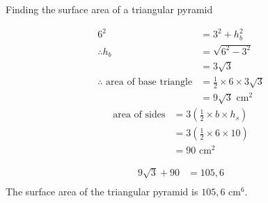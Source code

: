 \begin{wex}{Finding the surface area of a triangular pyramid}
{\begin{align*}
6^2 &= 3^2+h_b^2\\
\therefore h_b&=\sqrt{6^2-3^2}\\
&=3\sqrt{3}\\
\therefore \mbox{ area of base triangle} &= \frac{1}{2} \times 6 \times 3\sqrt{3}\\
&=9\sqrt{3}\mbox{ cm}^2
\end{align*}
\begin{align*}
 \mbox{area of sides} &= 3(\frac{1}{2} \times b\times h_s)\\
&=3(\frac{1}{2} \times 6 \times 10)\\
&=90\mbox{ cm}^2
\end{align*}

\begin{align*}
9\sqrt{3} + 90&=105,6\\

\end{align*}
The surface area of the triangular pyramid is $105,6$ cm$^{6}$.
}
\end{wex}

